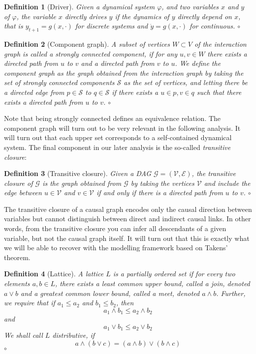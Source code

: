 \documentclass[11pt, a4paper]{memoir}
\theoremstyle{break}
\theoremstyle{break}
\newtheorem{innerdefn}{Definition}
\newenvironment{defn}
  {\begin{innerdefn}}
  {\ensuremath{\circ}\end{innerdefn}}
\theoremstyle{nonumberplain}
\begin{document}
\begin{defn}[Driver]
Given a dynamical system $\varphi$, and two variables $x$ and $y$ of $\varphi$, the variable $x$ \emph{directly drives} $y$ if the dynamics of $y$ directly depend on $x$, that is $y_{t+1}=g(x,\cdot)$ for discrete systems and $\dot{y}=g(x,\cdot)$ for continuous.
\end{defn}
\begin{defn}[Component graph]
A subset of vertices $W\subset V$ of the interaction graph is called a \emph{strongly connected component}, if for any $u,v\in W$ there exists a directed path from $u$ to $v$ and a directed path from $v$ to $u$. We define the \emph{component graph} as the graph obtained from the interaction graph by taking the set of strongly connected components $\mathcal{S}$ as the set of vertices, and letting there be a directed edge from $p\in \mathcal{S}$ to $q\in \mathcal{S}$ if there exists a $u\in p,v\in q$ such that there exists a directed path from $u$ to $v$.
\end{defn}
Note that being strongly connected defines an equivalence relation. The component graph will turn out to be very relevant in the following analysis.
It will turn out that each upper set corresponds to a self-contained dynamical system. The final component in our later analysis is the so-called \textit{transitive closure}:
\begin{defn}[Transitive closure]
Given a DAG $\mathcal{G}=(\mathcal{V},\mathcal{E})$, the \emph{transitive  closure of $\mathcal{G}$} is the graph obtained from $\mathcal{G}$ by taking the vertices $\mathcal{V}$ and include the edge between $u\in \mathcal{V}$ and $v\in \mathcal{V}$ if and only if there is a directed path from $u$ to $v$.
\end{defn}
The transitive closure of a causal graph encodes only the causal direction between variables but cannot distinguish between direct and indirect causal links. In other words, from the transitive closure you can infer all descendants of a given variable, but not the causal graph itself. It will turn out that this is exactly what we will be able to recover with the modelling framework based on Takens' theorem.\\[10pt]
\begin{defn}[Lattice]
A \emph{lattice} $L$ is a partially ordered set if for every two elements $a,b\in L$, there exists a least common upper bound, called a \emph{join}, denoted $a \vee b$ and a greatest common lower bound, called a \emph{meet}, denoted $a\wedge b$. Further, we require that if $a_1\leqslant a_2$ and $b_1\leqslant b_2$, then
$$a_1\wedge b_1\leqslant a_2\wedge b_2$$
and
$$a_1\vee b_1\leqslant a_2\vee b_2$$
We shall call $L$ \emph{distributive}, if
$$a\wedge(b\vee c)=(a\wedge b)\vee (b\wedge c)$$
\end{defn}
\end{document}

